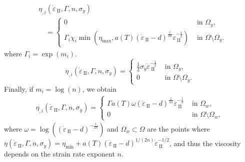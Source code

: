 \documentclass[12pt]{article}
\newcommand{\vrnote}[1]{\textcolor{red}{VR: #1}}
\newcommand{\IIinv}{{\dot\varepsilon}_{\mathrm{\!\!\:II}}}
\begin{document}
\begin{align*}
  &\eta_{,i}(\IIinv,\Gamma,n,\sigma_y) \\
  &\quad=\begin{cases}
    0 & \text{ in } \Omega_y,\\
    \Gamma_i\chi_i\min(\eta_{\max},a(T)(\IIinv-d)^{\frac{1}{2n}}\IIinv^{-\frac{1}{2}})
    & \text{ in } \Omega\setminus\Omega_y.
  \end{cases}
\end{align*}
where $\Gamma_i = \exp(m_i)$.
\begin{equation*}
  \eta_{,i}(\IIinv,\Gamma,n,\sigma_y) =
  \begin{cases}
    \frac{1}{2}\sigma_y\IIinv^{-\frac{1}{2}} & \text{ in } \Omega_y,\\
    0                          & \text{ in } \Omega\setminus\Omega_y.
  \end{cases}
  \end{equation*}
Finally, if $m_i = \log(n)$, we obtain
\begin{align*}
  \eta_{,i}(\IIinv,\Gamma,n,\sigma_y) =
  \begin{cases}
    \Gamma a(T)\omega(\IIinv-d)^{\frac{1}{2n}}\IIinv^{-\frac{1}{2}} &
    \text{ in }\Omega_w,\\
    0 & \text{ in } \Omega\setminus\Omega_w,
  \end{cases}
  \end{align*}
where $\omega = \log((\IIinv-d)^{-\frac{1}{2n}})$ and
$\Omega_w\subset\Omega$ are the points where
$\eta(\IIinv,\Gamma,n,\sigma_y) = \eta_{\min} +
a(T)(\IIinv-d)^{1/(2n)}\IIinv^{-1/2}$, and thus the viscosity depends
on the strain rate exponent $n$.
\end{document}
